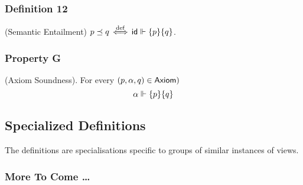 \subsubsection{Definition 12} (Semantic Entailment)
$p \preceq q  \mathrel{\stackrel{\mathrm{def}}{\,\Leftarrow\!\Rightarrow\,}} {\mathsf{id}} \Vdash \{p\} \{q\}$.

\subsubsection{Property G} (Axiom Soundness).
For every $(p,\alpha,q) \in \mathsf{Axiom})$
\[
  {\alpha} \Vdash \{p\} \{q\}
\]

\setcounter{secnumdepth}{4}

\subsection{Specialized Definitions}

The definitions are specialisations
specific to groups of similar instances of views.

\setcounter{secnumdepth}{0}

\subsubsection{More To Come \ldots}

\setcounter{secnumdepth}{4}

